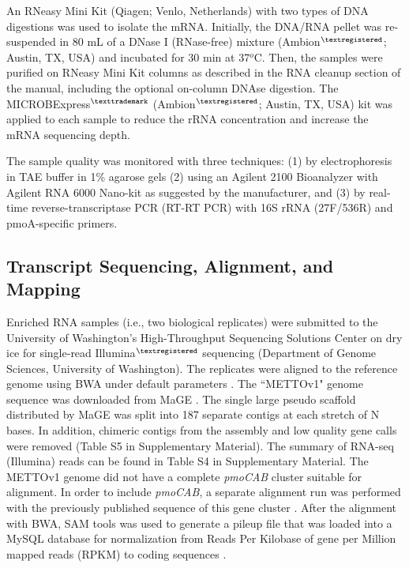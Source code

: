 An RNeasy Mini Kit (Qiagen; Venlo, Netherlands) with two types of DNA digestions was used to isolate the mRNA. Initially, the DNA/RNA pellet was re-suspended in 80 mL of a DNase I (RNase-free) mixture (Ambion$^{\textregistered}$; Austin, TX, USA) and incubated for 30 min at 37$^o$C.
Then, the samples were purified on RNeasy Mini Kit columns as described in the RNA cleanup section of the manual, including the optional on-column DNAse digestion.
The MICROBExpress$^{\texttrademark}$ (Ambion$^{\textregistered}$; Austin, TX, USA) kit was applied to each sample to reduce the rRNA concentration and increase the mRNA sequencing depth.

The sample quality was monitored with three techniques: (1) by electrophoresis in TAE buffer in 1\% agarose gels (2) using an Agilent 2100 Bioanalyzer with Agilent RNA 6000 Nano-kit as suggested by the manufacturer, and (3) by real-time reverse-transcriptase PCR (RT-RT PCR) with 16S rRNA (27F/536R) and pmoA-specific \cite{auman2001} primers.

\subsection{Transcript Sequencing, Alignment, and Mapping}
Enriched RNA samples (i.e., two biological replicates) were submitted to the University of Washington’s High-Throughput Sequencing Solutions Center on dry ice for single-read Illumina$^{\textregistered}$ sequencing (Department of Genome Sciences, University of Washington).
The replicates were aligned to the reference genome using BWA under default parameters \cite{li2009}.
The ``METTOv1" genome sequence was downloaded from MaGE \cite{vallenet2006}.
The single large pseudo scaffold distributed by MaGE was split into 187 separate contigs at each stretch of N bases.
In addition, chimeric contigs from the assembly and low quality gene calls were removed (Table S5 in Supplementary Material).
The summary of RNA-seq (Illumina) reads can be found in Table S4 in Supplementary Material.
The METTOv1 genome did not have a complete \textit{pmoCAB} cluster suitable for alignment.
In order to include \textit{pmoCAB}, a separate alignment run was performed with the previously published sequence of this gene cluster \cite{holmes1995}.
After the alignment with BWA, SAM tools was used to generate a pileup file that was loaded into a MySQL database for normalization from Reads Per Kilobase of gene per Million mapped reads (RPKM) to coding sequences \cite{mortazavi2008}.

